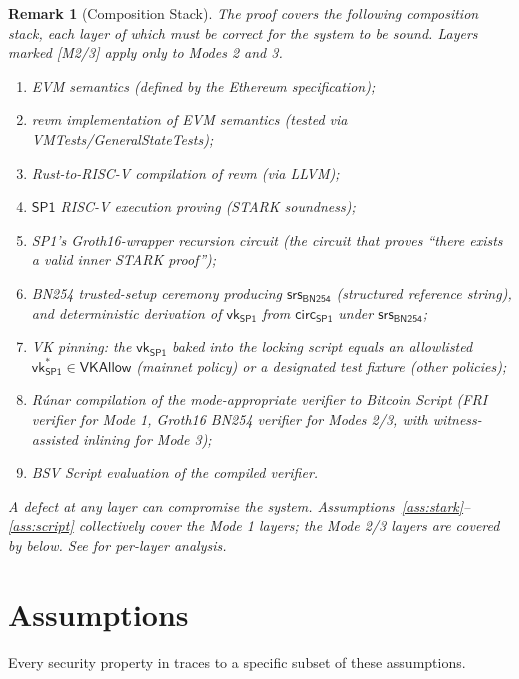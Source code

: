 \documentclass[11pt,a4paper]{article}
\newtheorem{remark}{Remark}[section]
\newcommand{\SPone}{\mathsf{SP1}}
\newcommand{\revm}{\textsf{revm}}
\newcommand{\Runar}{\textsf{R\'{u}nar}}
\newcommand{\SRS}{\mathsf{srs}_{\mathsf{BN254}}}  %
\newcommand{\vkSP}{\mathsf{vk}_{\SPone}}           %
\newcommand{\VKAllow}{\mathsf{VKAllow}}            %
\begin{document}
\begin{remark}[Composition Stack]\label{rem:composition}
The proof covers the following composition stack, each layer of which must be correct for the system to be sound. Layers marked [M2/3] apply only to Modes 2 and 3.
\begin{enumerate}[nosep]
    \item EVM semantics (defined by the Ethereum specification);
    \item \revm{} implementation of EVM semantics (tested via VMTests/GeneralStateTests);
    \item Rust-to-RISC-V compilation of \revm{} (via LLVM);
    \item $\SPone$ RISC-V execution proving (STARK soundness);
    \item[\textit{M2/3:}] SP1's Groth16-wrapper recursion circuit (the circuit that proves ``there exists a valid inner STARK proof'');
    \item[\textit{M2/3:}] BN254 trusted-setup ceremony producing $\SRS$ (structured reference string), and deterministic derivation of $\vkSP$ from $\mathsf{circ}_{\SPone}$ under $\SRS$;
    \item[\textit{M2/3:}] VK pinning: the $\vkSP$ baked into the locking script equals an allowlisted $\vkSP^* \in \VKAllow$ (mainnet policy) or a designated test fixture (other policies);
    \item \Runar{} compilation of the mode-appropriate verifier to Bitcoin Script (FRI verifier for Mode 1, Groth16 BN254 verifier for Modes 2/3, with witness-assisted inlining for Mode 3);
    \item BSV Script evaluation of the compiled verifier.
\end{enumerate}
A defect at any layer can compromise the system. Assumptions~\ref{ass:stark}--\ref{ass:script} collectively cover the Mode 1 layers; the Mode 2/3 layers are covered by  below. See  for per-layer analysis.
\end{remark}

\section{Assumptions}\label{sec:assumptions}

Every security property in  traces to a specific subset of these assumptions.
\end{document}
